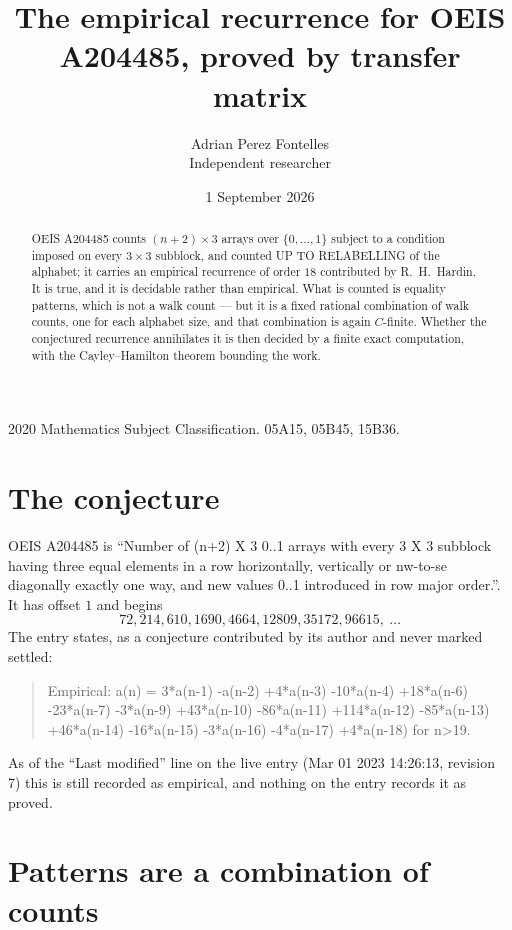 \documentclass[11pt,a4paper]{article}
\title{The empirical recurrence for OEIS A204485, proved by transfer matrix}
\author{Adrian Perez Fontelles\\ \small Independent researcher}
\date{1 September 2026}
\theoremstyle{plain}
\theoremstyle{definition}
\begin{document}
\maketitle

\begin{abstract}
OEIS A204485 counts $(n+2)\times3$ arrays over $\{0,\dots,1\}$ subject to a condition imposed on
every $3\times3$ subblock, and counted UP TO RELABELLING of the
alphabet; it carries an empirical recurrence of order $18$ contributed by
R.~H.~Hardin. It is true, and it is decidable rather than empirical. What is counted is
equality patterns, which is not a walk count --- but it is a fixed rational combination of
walk counts, one for each alphabet size, and that combination is again $C$-finite. Whether the
conjectured recurrence annihilates it is then decided by a finite exact computation, with the
Cayley--Hamilton theorem bounding the work.
\end{abstract}

\noindent\small 2020 Mathematics Subject Classification. 05A15, 05B45, 15B36.\normalsize

\section{The conjecture}

OEIS A204485 is ``Number of (n+2) X 3 0..1 arrays with every 3 X 3 subblock having three equal elements in a row horizontally, vertically or nw-to-se diagonally exactly one way, and new values 0..1 introduced in row major order.''. It has offset $1$ and begins
\[
72, 214, 610, 1690, 4664, 12809, 35172, 96615,\ \dots
\]
The entry states, as a conjecture contributed by its author and never marked settled:
\begin{quote}
Empirical: a(n) = 3*a(n-1) -a(n-2) +4*a(n-3) -10*a(n-4) +18*a(n-6) -23*a(n-7) -3*a(n-9) +43*a(n-10) -86*a(n-11) +114*a(n-12) -85*a(n-13) +46*a(n-14) -16*a(n-15) -3*a(n-16) -4*a(n-17) +4*a(n-18) for n>19.
\end{quote}
As of the ``Last modified'' line on the live entry (Mar 01 2023 14:26:13, revision 7) this is still
recorded as empirical, and nothing on the entry records it as proved.

\section{Patterns are a combination of counts}
\end{document}
